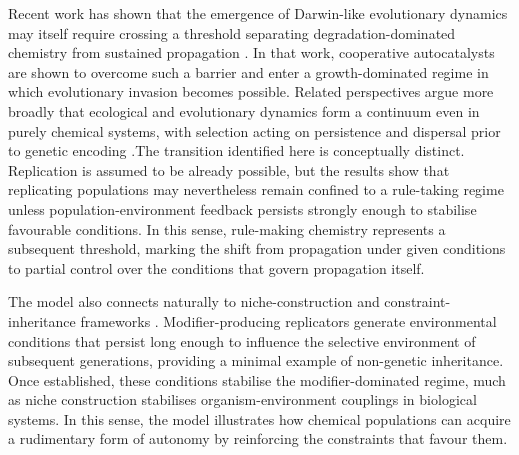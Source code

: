 Recent work has shown that the emergence of Darwin-like evolutionary dynamics may itself require crossing a threshold separating degradation-dominated chemistry from sustained propagation \cite{Kocher2024PrebioticEmergence}. In that work, cooperative autocatalysts are shown to overcome such a barrier and enter a growth-dominated regime in which evolutionary invasion becomes possible. Related perspectives argue more broadly that ecological and evolutionary dynamics form a continuum even in purely chemical systems, with selection acting on persistence and dispersal prior to genetic encoding \cite{Baum2023Continuum}.The transition identified here is conceptually distinct. Replication is assumed to be already possible, but the results show that replicating populations may nevertheless remain confined to a rule-taking regime unless population-environment feedback persists strongly enough to stabilise favourable conditions. In this sense, rule-making chemistry represents a subsequent threshold, marking the shift from propagation under given conditions to partial control over the conditions that govern propagation itself.

The model also connects naturally to niche-construction and constraint-inheritance frameworks \cite{Laland1999Niche}. Modifier-producing replicators generate environmental conditions that persist long enough to influence the selective environment of subsequent generations, providing a minimal example of non-genetic inheritance. Once established, these conditions stabilise the modifier-dominated regime, much as niche construction stabilises organism-environment couplings in biological systems. In this sense, the model illustrates how chemical populations can acquire a rudimentary form of autonomy by reinforcing the constraints that favour them.


